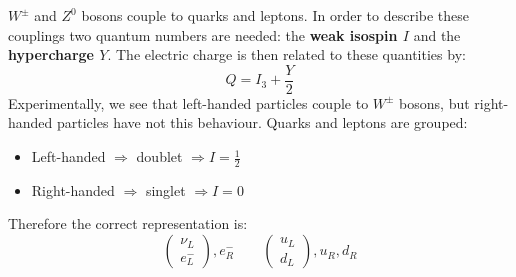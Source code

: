 \documentclass[../../main/main.tex]{subfiles}
\begin{document}
\( W^{\pm} \) and \( Z^0 \) bosons couple to quarks and leptons. In order to describe these couplings two quantum numbers are needed: the \textbf{weak isospin \( I \)} and the \textbf{hypercharge \( Y \)}. The electric charge is then related to these quantities by:
\begin{equation}
	Q
	=
	I_3 + \frac{Y}{2}
	\label{eq:}
\end{equation}
Experimentally, we see that left-handed particles couple to \( W^{\pm} \) bosons, but right-handed particles have not this behaviour. Quarks and leptons are grouped:
\begin{itemize}
	\item Left-handed \( \Longrightarrow \) doublet \( \Longrightarrow I = \frac{1}{2} \)
	\item Right-handed \( \Longrightarrow \) singlet \( \Longrightarrow I = 0 \)
\end{itemize}
Therefore the correct representation is:
\begin{equation}
	\begin{pmatrix}
		\nu_L \\
		e^-_L
	\end{pmatrix}, e^-_R
	\qquad
	\begin{pmatrix}
		u_L \\
		d_L
	\end{pmatrix}, u_R, d_R
	\label{eq:}
\end{equation}
\end{document}
